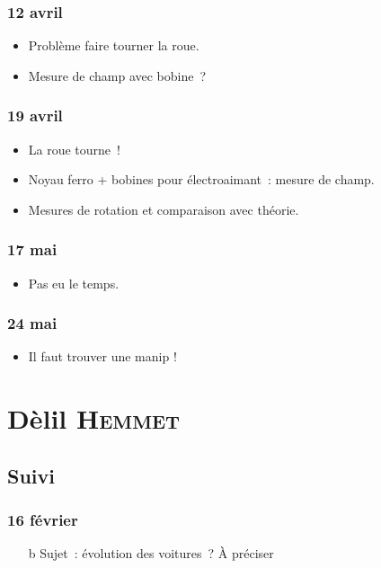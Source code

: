 \documentclass[a4paper, 11pt, final, garamond]{book}
\begin{document}
\subsection{12 avril}
\begin{itemize}
	\item Problème faire tourner la roue.
	\item Mesure de champ avec bobine~?
\end{itemize}

\subsection{19 avril}
\begin{itemize}
	\item La roue tourne~!
	\item Noyau ferro + bobines pour électroaimant~: mesure de champ.
	\item Mesures de rotation et comparaison avec théorie.
\end{itemize}

\subsection{17 mai}
\begin{itemize}
	\item Pas eu le temps.
\end{itemize}

\subsection{24 mai}
\begin{itemize}
	\item Il faut trouver une manip !
\end{itemize}

\chapter{Dèlil \textsc{Hemmet}}
\label{ch:hemmet}

\section{Suivi}
\subsection{16 février}
\begin{itemize}
	\item[b]{Sujet}~: évolution des voitures~? À préciser
\end{itemize}
\end{document}
